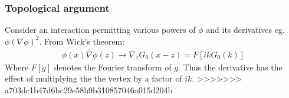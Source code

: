 \subsubsection{Topological argument}
Consider an interaction permitting various powers of $\phi$ and its derivatives eg. $\phi(\nabla\phi)^2$.
From Wick's theorem:
\begin{align*}
    \overline{\phi(x)\nabla\phi(z)}\rightarrow\nabla_z G_0(x-z)=F[ikG_0(k)]
\end{align*}
Where $F[g]$ denotes the Fourier transform of $g$. Thus the derivative has the effect of multiplying the the vertex by a factor of $ik$.
>>>>>>> a703dc1b47d6bc29e58b9b310857046a015d204b


